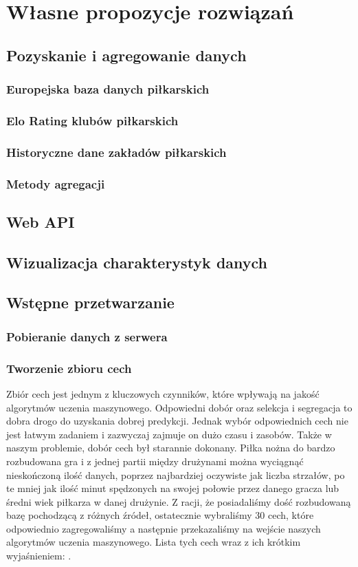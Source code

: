 \chapter{Własne propozycje rozwiązań}
    \section{Pozyskanie i agregowanie danych}
        \subsection{Europejska baza danych piłkarskich}
        \subsection{Elo Rating klubów piłkarskich}
        \subsection{Historyczne dane zakładów piłkarskich}
        \subsection{Metody agregacji}
    \section{Web API}
    \section{Wizualizacja charakterystyk danych}
    \section{Wstępne przetwarzanie}
        \subsection{Pobieranie danych z serwera}
        \subsection{Tworzenie zbioru cech}
        Zbiór cech jest jednym z kluczowych czynników, które wpływają na jakość algorytmów uczenia maszynowego. Odpowiedni dobór oraz selekcja i segregacja to dobra drogo do uzyskania dobrej predykcji. Jednak wybór odpowiednich cech nie jest łatwym zadaniem i zazwyczaj zajmuje on dużo czasu i zasobów. Także w naszym problemie, dobór cech był starannie dokonany. Piłka nożna do bardzo rozbudowana gra i z jednej partii między drużynami można wyciągnąć nieskończoną ilość danych, poprzez najbardziej oczywiste jak liczba strzałów, po te mniej jak ilość minut spędzonych na swojej połowie przez danego gracza lub średni wiek piłkarza w danej drużynie. Z racji, że posiadaliśmy dość rozbudowaną bazę pochodzącą z różnych źródeł, ostatecznie wybraliśmy 30 cech, które odpowiednio zagregowaliśmy a następnie przekazaliśmy na wejście naszych algorytmów uczenia maszynowego. Lista tych cech wraz z ich krótkim wyjaśnieniem: .
        
